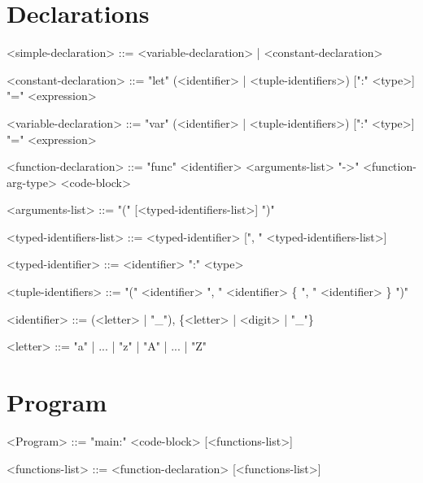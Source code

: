 \documentclass{article}
\begin{document}
\section{Declarations}
\begin{grammar}

<simple-declaration> ::= <variable-declaration> | <constant-declaration> 

<constant-declaration> ::= "let" (<identifier> | <tuple-identifiers>) [":" <type>] "=" <expression>

<variable-declaration> ::= "var" (<identifier> | <tuple-identifiers>) [":" <type>] "=" <expression>

<function-declaration> ::= "func" <identifier> <arguments-list> "->" <function-arg-type> <code-block>

<arguments-list> ::= "(" [<typed-identifiers-list>] ")"

<typed-identifiers-list> ::= <typed-identifier> [", " <typed-identifiers-list>]

<typed-identifier> ::= <identifier> ":" <type>

<tuple-identifiers> ::= "(" <identifier> ", " <identifier> \{ ", " <identifier> \} ")"

<identifier> ::= (<letter> | "_"), \{<letter> | <digit> | "_"\}

<letter> ::= "a" | ... | "z" | "A" | ... | "Z"
\end{grammar}

\section{Program}
\begin{grammar}

<Program> ::= "main:" <code-block> [<functions-list>]

<functions-list> ::= <function-declaration> [<functions-list>]

\end{grammar}
\end{document}
